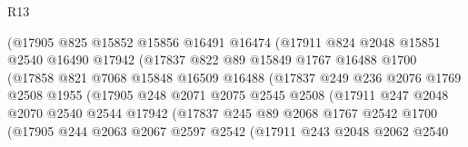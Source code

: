 \begin{lexlean}{R13}
\begin{coremodule}
                        (@17905
                          @825
                          @15852
                          @15856
                          @16491
                          @16474
                          (@17911
                            @824
                            @2048
                            @15851
                            @2540
                            @16490
                            @17942
                            (@17837
                              @822
                              @89
                              @15849
                              @1767
                              @16488
                              @1700
                              (@17858
                                @821
                                @7068
                                @15848
                                @16509
                                @16488
                                (@17837
                                  @249
                                  @236
                                  @2076
                                  @1769
                                  @2508
                                  @1955
                                  (@17905
                                    @248
                                    @2071
                                    @2075
                                    @2545
                                    @2508
                                    (@17911
                                      @247
                                      @2048
                                      @2070
                                      @2540
                                      @2544
                                      @17942
                                      (@17837
                                        @245
                                        @89
                                        @2068
                                        @1767
                                        @2542
                                        @1700
                                        (@17905
                                          @244
                                          @2063
                                          @2067
                                          @2597
                                          @2542
                                          (@17911
                                            @243
                                            @2048
                                            @2062
                                            @2540

\end{coremodule}
\end{lexlean}
